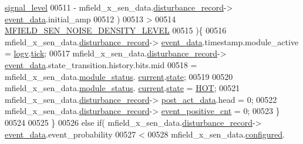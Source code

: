 \begin{DoxyCode}
      \hyperlink{a00019_a4070db8eab0ff93e3fbc1df59872f117}{signal\_level}
00511                             - mfield\_x\_sen\_data.\hyperlink{a00025_ac9b38e2c1d3f1013a88d33506c754152}{disturbance\_record}->
      \hyperlink{a00028_a8c0bda69e71ef674e60da47ad0be9ab0}{event\_data}.initial\_amp
00512                             )
00513                             >
00514                             \hyperlink{a00019_aafdb9e443a3251c41a62e1a1534673f9}{MFIELD\_SEN\_NOISE\_DENSITY\_LEVEL}
00515                           )\{
00516                                  mfield\_x\_sen\_data.\hyperlink{a00025_ac9b38e2c1d3f1013a88d33506c754152}{disturbance\_record}->
      \hyperlink{a00028_a8c0bda69e71ef674e60da47ad0be9ab0}{event\_data}.timestamp.module\_active = \hyperlink{a00021_a2e89c46668b39a17753c238950c9e1ec}{logv}.\hyperlink{a00021_a81f0ce68c2c483fb8df726cc1988d8e8}{tick};
00517                                  mfield\_x\_sen\_data.\hyperlink{a00025_ac9b38e2c1d3f1013a88d33506c754152}{disturbance\_record}->
      \hyperlink{a00028_a8c0bda69e71ef674e60da47ad0be9ab0}{event\_data}.state\_transition.history.bits.mid
00518                                  = mfield\_x\_sen\_data.\hyperlink{a00025_adfab5a5d8b45a93dfb13edb24e2b80e3}{module\_status}.
      \hyperlink{a00019_acf41ffc11da291c2f9f0fcb02ee72b98}{current}.\hyperlink{a00019_a6b8d8e916bc56265a3fd279bd26b6d1b}{state};
00519 
00520                                  mfield\_x\_sen\_data.\hyperlink{a00025_adfab5a5d8b45a93dfb13edb24e2b80e3}{module\_status}.
      \hyperlink{a00019_acf41ffc11da291c2f9f0fcb02ee72b98}{current}.\hyperlink{a00019_a6b8d8e916bc56265a3fd279bd26b6d1b}{state} = \hyperlink{a00021_a1eb14cc432874ddacd1934791dbe12a3}{HOT};
00521                                  mfield\_x\_sen\_data.\hyperlink{a00025_ac9b38e2c1d3f1013a88d33506c754152}{disturbance\_record}->
      \hyperlink{a00028_a9c699c0cc82d0baa6e49195f185ab34f}{post\_act\_data}.head = 0;
00522                                  mfield\_x\_sen\_data.\hyperlink{a00025_ac9b38e2c1d3f1013a88d33506c754152}{disturbance\_record}->
      \hyperlink{a00028_a7397b9d76d4b57500f27bb23d258a18a}{event\_positive\_cnt} = 0;
00523                            \}
00524 
00525                    \}
00526                    \textcolor{keywordflow}{else} \textcolor{keywordflow}{if}( mfield\_x\_sen\_data.\hyperlink{a00025_ac9b38e2c1d3f1013a88d33506c754152}{disturbance\_record}->
      \hyperlink{a00028_a8c0bda69e71ef674e60da47ad0be9ab0}{event\_data}.event\_probability
00527                             <
00528                            mfield\_x\_sen\_data.\hyperlink{a00025_a94b2d1f6ea4ab334c74d24984dd27843}{configured}.

\end{DoxyCode}
